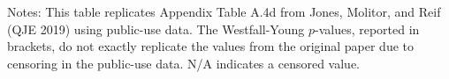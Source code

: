 \documentclass{article}
\begin{document}
\begin{table}[tbp]
{\begin{tabularx}{\linewidth}{lCCCC}
\end{tabularx}
\begin{flushleft}
\footnotesize Notes: This table replicates Appendix Table A.4d from Jones, Molitor, and Reif (QJE 2019) using public-use data. The Westfall-Young \(p\)-values, reported in brackets, do not exactly replicate the values from the original paper due to censoring in the public-use data. N/A indicates a censored value.
\end{flushleft}
}
\end{table}
\end{document}

